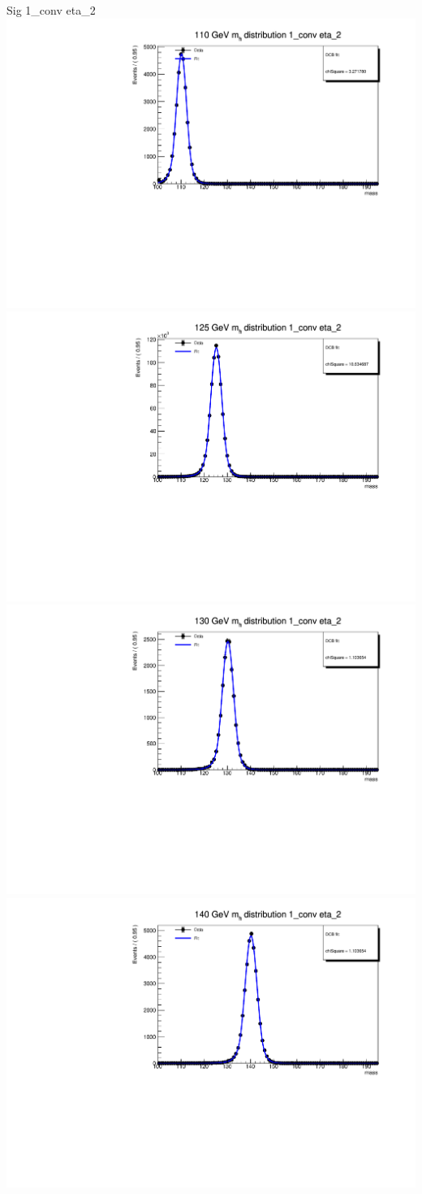 \documentclass[10pt,UKenglish, leqno, xcolor = dvipsnames]{beamer}
\begin{document}
		\begin{frame}{Sig 1\_conv eta\_2}
			\vfill
			\centering
			\includegraphics[width=.45\textwidth]{../images/week_10/PowhegPy8_NNLOPS_ggH110_1_conv_eta_2_fit.pdf}
			\includegraphics[width=.45\textwidth]{../images/week_10/PowhegPy8_NNLOPS_ggH125_1_conv_eta_2_fit.pdf}\\
			\includegraphics[width=.45\textwidth]{../images/week_10/PowhegPy8_NNLOPS_ggH130_1_conv_eta_2_fit.pdf}
			\includegraphics[width=.45\textwidth]{../images/week_10/PowhegPy8_NNLOPS_ggH140_1_conv_eta_2_fit.pdf}
			\vfill
		\end{frame}
	
\end{document}
